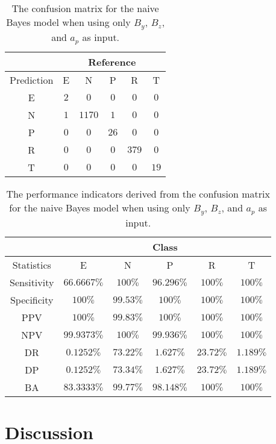 \documentclass[preprint,12pt]{elsarticle}
\begin{document}
\begin{table}[!ht]
	\centering
	\begin{tabular}{|c|c|c|c|c|c|}
		\hline
		 & \multicolumn{5}{|c|}{Reference} \\ \hline
		 Prediction & E & N & P & R & T \\ \hline
		 E & $2$ & $0$ & $0$ & $0$ & $0$ \\ \hline
		 N & $1$ & $1170$ & $1$ & $0$ & $0$ \\ \hline
		 P & $0$ & $0$ & $26$ & $0$ & $0$ \\ \hline
		 R & $0$ & $0$ & $0$ & $379$ & $0$ \\ \hline
		 T & $0$ & $0$ & $0$ & $0$ & $19$ \\ \hline
	\end{tabular}
	\caption{The confusion matrix for the naive Bayes model when using only $B_{y}$, $B_{z}$, and $a_{p}$ as input.}
	\label{tab:cm:yzap:nb}
\end{table}

\begin{table}[!ht]
	\centering
	\begin{tabular}{|c|c|c|c|c|c|}
		\hline
		 & \multicolumn{5}{c|}{Class} \\ \hline
		Statistics & E & N & P & R & T \\ \hline
		Sensitivity & $66.6667\%$ & $100\%$ & $96.296\%$ & $100\%$ & $100\%$ \\ \hline
		Specificity & $100\%$ & $99.53\%$ & $100\%$ & $100\%$ & $100\%$ \\ \hline
		PPV & $100\%$ & $99.83\%$ & $100\%$ & $100\%$ & $100\%$ \\ \hline
		NPV & $99.9373\%$ & $100\%$ & $99.936\%$ & $100\%$ & $100\%$ \\ \hline
		DR & $0.1252\%$ & $73.22\%$ & $1.627\%$ & $23.72\%$ & $1.189\%$ \\ \hline
		DP & $0.1252\%$ & $73.34\%$ & $1.627\%$ & $23.72\%$ & $1.189\%$ \\ \hline
		BA & $83.3333\%$ & $99.77\%$ & $98.148\%$ & $100\%$ & $100\%$ \\ \hline
	\end{tabular}
	\caption{The performance indicators derived from the confusion matrix for the naive Bayes model when using only $B_{y}$, $B_{z}$, and $a_{p}$ as input.}
	\label{tab:cs:reverse:yzap:nb}
\end{table}

\section{Discussion}
\end{document}
